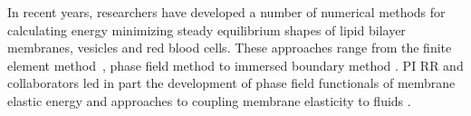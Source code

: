 In recent years, researchers have developed a number of numerical methods for calculating
energy minimizing steady equilibrium shapes of lipid bilayer membranes, vesicles and red blood cells.
These approaches range from the finite element method~\cite{Bartels,Peng13,RyKlYaCo16,Sinha15}, 
phase field method \cite{Du05,QiangDu08,Lowengrub13} to immersed
boundary method  \cite{Hu,Hu13, KimLai2010_JCP}.
PI RR and collaborators led in part the development of phase field
functionals of membrane elastic energy and approaches to coupling membrane elasticity to fluids  \cite{0951-7715-18-3-016,Du05,DuEuler,QiangDu09}.




%
%
%
%
%
%


%


